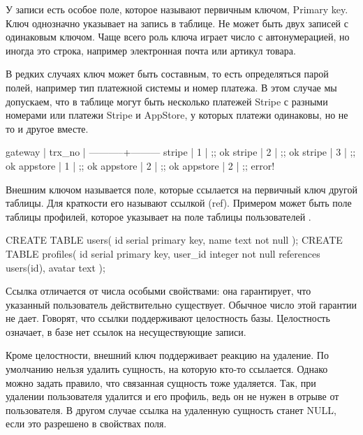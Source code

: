 У записи есть особое поле, которое называют первичным ключом, Primary key. Ключ однозначно указывает на запись в таблице. Не может быть двух записей с одинаковым ключом. Чаще всего роль ключа играет число с автонумерацией, но иногда это строка, например электронная почта или артикул товара.

В редких случаях ключ может быть составным, то есть определяться парой полей, например тип платежной системы и номер платежа. В этом случае мы допускаем, что в таблице могут быть несколько платежей Stripe с разными номерами или платежи Stripe и AppStore, у которых платежи одинаковы, но не то и другое вместе.

\begin{english}
  \begin{text}
 gateway   | trx_no |
-----------+---------
 stripe    | 1      | ;; ok
 stripe    | 2      | ;; ok
 stripe    | 3      | ;; ok
 appstore  | 1      | ;; ok
 appstore  | 2      | ;; ok
 appstore  | 2      | ;; error!
  \end{text}
\end{english}

Внешним ключом называется поле, которые ссылается на первичный ключ другой таблицы. Для краткости его называют ссылкой (ref). Примером может быть поле  таблицы профилей, которое указывает на поле  таблицы пользователей .

\begin{english}
  \begin{sql/lines}
CREATE TABLE users(
    id   serial primary key,
    name text not null
);
CREATE TABLE profiles(
    id      serial primary key,
    user_id integer not null references users(id),
    avatar  text
);
  \end{sql/lines}
\end{english}

Ссылка отличается от числа особыми свойствами: она гарантирует, что указанный пользователь действительно существует. Обычное число этой гарантии не дает. Говорят, что ссылки поддерживают целостность базы. Целостность означает, в базе нет ссылок на несуществующие записи.

Кроме целостности, внешний ключ поддерживает реакцию на удаление. По умолчанию нельзя удалить сущность, на которую кто-то ссылается. Однако можно задать правило, что связанная сущность тоже удаляется. Так, при удалении пользователя удалится и его профиль, ведь он не нужен в отрыве от пользователя. В другом случае ссылка на удаленную сущность станет NULL, если это разрешено в свойствах поля.

